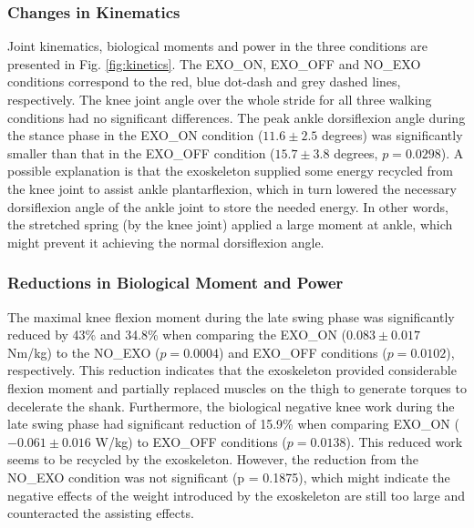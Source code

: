 \documentclass[twocolumn,cleanfoot,10pt]{asme2ej}
\begin{document}
\subsubsection{Changes in Kinematics}
Joint kinematics, biological moments and power in the three conditions are presented in Fig. \ref{fig:kinetics}.
The EXO\_ON, EXO\_OFF and NO\_EXO conditions correspond to the red, blue dot-dash and grey dashed lines, respectively.
The knee joint angle over the whole stride for all three walking conditions had no significant differences.
The peak ankle dorsiflexion angle during the stance phase in the EXO\_ON condition ($11.6\pm2.5$ degrees) was significantly smaller than that in the EXO\_OFF condition ($15.7\pm3.8$ degrees, $p=0.0298$).
A possible explanation is that the exoskeleton supplied some energy recycled from the knee joint to assist ankle plantarflexion, which in turn lowered the necessary dorsiflexion angle of the ankle joint to store the needed energy.
In other words, the stretched spring (by the knee joint) applied a large moment at ankle, which might prevent it achieving the normal dorsiflexion angle.

\subsubsection{Reductions in Biological Moment and Power}
The maximal knee flexion moment during the late swing phase was significantly reduced by 43\% and 34.8\% when comparing the EXO\_ON ($0.083\pm0.017$ Nm/kg) to the NO\_EXO ($p = 0.0004$) and EXO\_OFF conditions ($p = 0.0102$), respectively.
This reduction indicates that the exoskeleton provided considerable flexion moment and partially replaced muscles on the thigh to generate torques to decelerate the shank.
Furthermore, the biological negative knee work during the late swing phase had significant reduction of 15.9\% when comparing EXO\_ON ($-0.061\pm0.016$ W/kg) to EXO\_OFF conditions ($p = 0.0138$).
This reduced work seems to be recycled by the exoskeleton.
However, the reduction from the NO\_EXO condition was not significant (p = 0.1875), which might indicate the negative effects of the weight introduced by the exoskeleton are still too large and counteracted the assisting effects.
\end{document}
